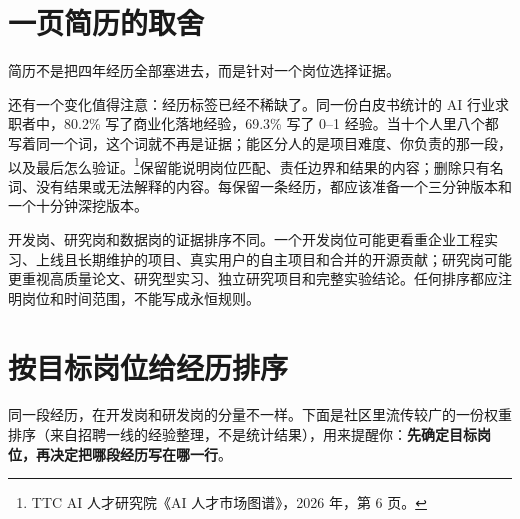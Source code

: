 \documentclass[UTF8,zihao=5,openany]{ctexbook}
\begin{document}
\section{一页简历的取舍}
简历不是把四年经历全部塞进去，而是针对一个岗位选择证据。

还有一个变化值得注意：经历标签已经不稀缺了。同一份白皮书统计的 AI 行业求职者中，80.2\% 写了商业化落地经验，69.3\% 写了 0--1 经验。当十个人里八个都写着同一个词，这个词就不再是证据；能区分人的是项目难度、你负责的那一段，以及最后怎么验证。\footnote{TTC AI 人才研究院《AI 人才市场图谱》，2026 年，第 6 页。}保留能说明岗位匹配、责任边界和结果的内容；删除只有名词、没有结果或无法解释的内容。每保留一条经历，都应该准备一个三分钟版本和一个十分钟深挖版本。



开发岗、研究岗和数据岗的证据排序不同。一个开发岗位可能更看重企业工程实习、上线且长期维护的项目、真实用户的自主项目和合并的开源贡献；研究岗可能更重视高质量论文、研究型实习、独立研究项目和完整实验结论。任何排序都应注明岗位和时间范围，不能写成永恒规则。

\section{按目标岗位给经历排序}

同一段经历，在开发岗和研发岗的分量不一样。下面是社区里流传较广的一份权重排序（来自招聘一线的经验整理，不是统计结果），用来提醒你：\textbf{先确定目标岗位，再决定把哪段经历写在哪一行}。
\end{document}
